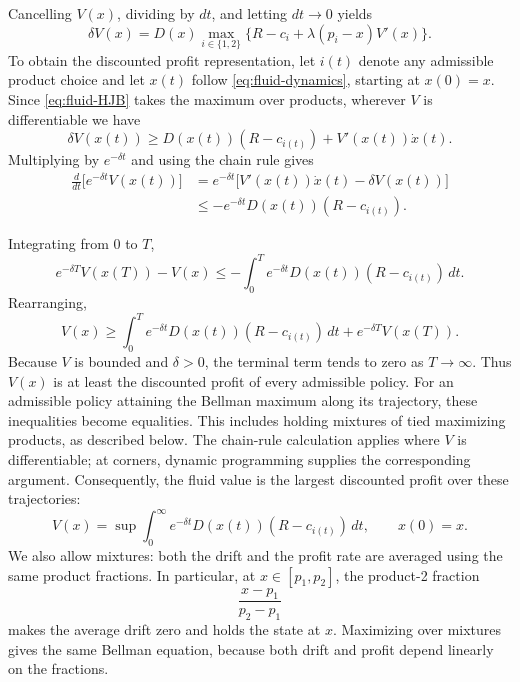 \documentclass[11pt]{article}
\begin{document}
Cancelling $V(x)$, dividing by $dt$, and letting $dt\to0$ yields
\begin{equation}\label{eq:fluid-HJB}
\delta V(x)=D(x)\max_{i\in\{1,2\}}
\{R-c_i+\lambda(p_i-x)V'(x)\}.
\end{equation}
To obtain the discounted profit representation, let $i(t)$ denote any
admissible product choice and let $x(t)$ follow
\eqref{eq:fluid-dynamics}, starting at $x(0)=x$. Since
\eqref{eq:fluid-HJB} takes the maximum over products, wherever $V$ is
differentiable we have
\begin{equation*}
\delta V(x(t))
\ge D(x(t))(R-c_{i(t)})+V'(x(t))\dot x(t).
\end{equation*}
Multiplying by $e^{-\delta t}$ and using the chain rule gives
\begin{align*}
\frac{d}{dt}\bigl[e^{-\delta t}V(x(t))\bigr]
&=e^{-\delta t}\bigl[V'(x(t))\dot x(t)-\delta V(x(t))\bigr]\\
&\le -e^{-\delta t}D(x(t))(R-c_{i(t)}).
\end{align*}

Integrating from $0$ to $T$,
\begin{equation*}
e^{-\delta T}V(x(T))-V(x)
\le -\int_0^T e^{-\delta t}D(x(t))(R-c_{i(t)})\,dt.
\end{equation*}
Rearranging,
\begin{equation*}
V(x)\ge
\int_0^T e^{-\delta t}D(x(t))(R-c_{i(t)})\,dt
+e^{-\delta T}V(x(T)).
\end{equation*}
Because $V$ is bounded and $\delta>0$, the terminal term tends to zero
as $T\to\infty$. Thus $V(x)$ is at least the discounted profit of every
admissible policy. For an admissible policy attaining the Bellman maximum
along its trajectory, these inequalities become equalities. This includes
holding mixtures of tied maximizing products, as described below.
The chain-rule calculation applies where $V$ is differentiable; at
corners, dynamic programming supplies the corresponding argument.
Consequently, the fluid value is the largest discounted profit over
these trajectories:
\begin{equation}\label{eq:fluid-value}
V(x)=\sup\int_0^\infty e^{-\delta t}D(x(t))(R-c_{i(t)})\,dt,
\qquad x(0)=x.
\end{equation}
We also allow mixtures:
both the drift and the profit rate are averaged using the same product
fractions. In particular, at $x\in[p_1,p_2]$, the product-2 fraction
\begin{equation*}
\frac{x-p_1}{p_2-p_1}
\end{equation*}
makes the average drift zero and holds the state at $x$. Maximizing over
mixtures gives the same Bellman equation, because both drift and profit
depend linearly on the fractions.
\end{document}
